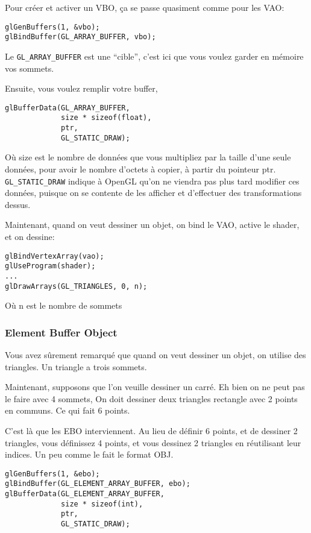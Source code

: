 \documentclass[11pt, a4paper, titlepage]{article}
\begin{document}
Pour créer et activer un VBO, ça se passe quasiment comme pour les
VAO:

\begin{lstlisting}
glGenBuffers(1, &vbo);
glBindBuffer(GL_ARRAY_BUFFER, vbo);
\end{lstlisting}

Le \texttt{GL\_ARRAY\_BUFFER} est une ``cible'', c'est ici que vous
voulez garder en mémoire vos sommets.

Ensuite, vous voulez remplir votre buffer,

\begin{lstlisting}
glBufferData(GL_ARRAY_BUFFER,
             size * sizeof(float),
             ptr,
             GL_STATIC_DRAW);
\end{lstlisting}

Où size est le nombre de données que vous multipliez par la taille
d'une seule données, pour avoir le nombre d'octets à copier, à partir
du pointeur ptr.  \texttt{GL\_STATIC\_DRAW} indique à OpenGL qu'on ne
viendra pas plus tard modifier ces données, puisque on se contente de
les afficher et d'effectuer des transformations dessus.

Maintenant, quand on veut dessiner un objet, on bind le VAO, active le
shader, et on dessine:

\begin{lstlisting}
glBindVertexArray(vao);
glUseProgram(shader);
...
glDrawArrays(GL_TRIANGLES, 0, n);
\end{lstlisting}

Où n est le nombre de sommets

\pagebreak
\subsubsection{Element Buffer Object}

Vous avez sûrement remarqué que quand on veut dessiner un objet, on
utilise des triangles.  Un triangle a trois sommets.

Maintenant, supposons que l'on veuille dessiner un carré. Eh bien on
ne peut pas le faire avec 4 sommets, On doit dessiner deux triangles
rectangle avec 2 points en communs. Ce qui fait 6 points.

C'est là que les EBO interviennent. Au lieu de définir 6 points, et de
dessiner 2 triangles, vous définissez 4 points, et vous dessinez 2
triangles en réutilisant leur indices. Un peu comme le fait le format
OBJ.

\begin{lstlisting}
glGenBuffers(1, &ebo);
glBindBuffer(GL_ELEMENT_ARRAY_BUFFER, ebo);
glBufferData(GL_ELEMENT_ARRAY_BUFFER,
             size * sizeof(int),
             ptr,
             GL_STATIC_DRAW);
\end{lstlisting}
\end{document}
